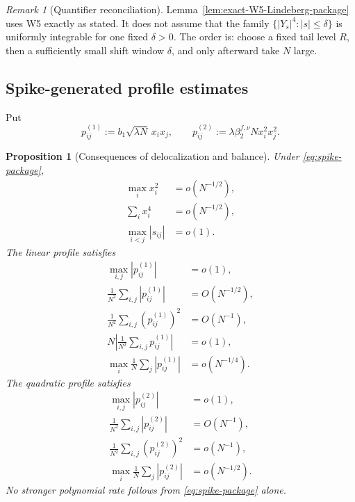 \documentclass[11pt]{article}
\newtheorem{proposition}[theorem]{Proposition}
\theoremstyle{definition}
\theoremstyle{remark}
\newtheorem{remark}[theorem]{Remark}
\begin{document}
\begin{remark}[Quantifier reconciliation]
Lemma~\ref{lem:exact-W5-Lindeberg-package} uses W5 exactly as stated.  It does
not assume that the family \(\{|Y_s|^4:|s|\le\delta\}\) is uniformly
integrable for one fixed \(\delta>0\).  The order is: choose a fixed tail level
\(R\), then a sufficiently small shift window \(\delta\), and only afterward
take \(N\) large.
\end{remark}

\subsection{Spike-generated profile estimates}

Put
\begin{equation}\label{eq:profiles-package}
 p_{ij}^{(1)}:=b_1\sqrt{\lambda N}\,x_ix_j,
 \qquad
 p_{ij}^{(2)}:=\lambda\beta_2^{f,\nu}N x_i^2x_j^2.
\end{equation}

\begin{proposition}[Consequences of delocalization and balance]
\label{prop:spike-rates-package}
Under \eqref{eq:spike-package},
\begin{align}
 \max_i x_i^2&=o(N^{-1/2}),
 \label{eq:max-square-package}\\
 \sum_i x_i^4&=o(N^{-1/2}),
 \label{eq:fourth-spike-package}\\
 \max_{i<j}|s_{ij}|&=o(1).
 \label{eq:max-microshift-package}
\end{align}
The linear profile satisfies
\begin{align}
 \max_{i,j}|p_{ij}^{(1)}|&=o(1),
 \label{eq:p1-max-package}\\
 \frac1{N^2}\sum_{i,j}|p_{ij}^{(1)}|&=O(N^{-1/2}),
 \label{eq:p1-L1-package}\\
 \frac1{N^2}\sum_{i,j}(p_{ij}^{(1)})^2&=O(N^{-1}),
 \label{eq:p1-L2-package}\\
 N\left|\frac1{N^2}\sum_{i,j}p_{ij}^{(1)}\right|&=o(1),
 \label{eq:p1-signed-package}\\
 \max_i\frac1N\sum_j|p_{ij}^{(1)}|&=o(N^{-1/4}).
 \label{eq:p1-row-package}
\end{align}
The quadratic profile satisfies
\begin{align}
 \max_{i,j}|p_{ij}^{(2)}|&=o(1),
 \label{eq:p2-max-package}\\
 \frac1{N^2}\sum_{i,j}|p_{ij}^{(2)}|&=O(N^{-1}),
 \label{eq:p2-L1-package}\\
 \frac1{N^2}\sum_{i,j}(p_{ij}^{(2)})^2&=o(N^{-1}),
 \label{eq:p2-L2-package}\\
 \max_i\frac1N\sum_j|p_{ij}^{(2)}|&=o(N^{-1/2}).
 \label{eq:p2-row-package}
\end{align}
No stronger polynomial rate follows from \eqref{eq:spike-package} alone.
\end{proposition}
\end{document}
